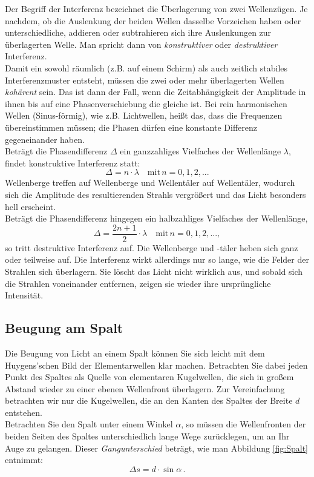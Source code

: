 Der Begriff der Interferenz bezeichnet die Überlagerung von zwei Wellenzügen. Je nachdem, ob die Auslenkung der beiden Wellen dasselbe Vorzeichen haben oder unterschiedliche, addieren oder subtrahieren sich ihre Auslenkungen zur überlagerten Welle. Man spricht dann von \textit{konstruktiver} oder \textit{destruktiver} Interferenz.\\
Damit ein sowohl räumlich (z.B. auf einem Schirm) als auch zeitlich stabiles Interferenzmuster entsteht, müssen die zwei oder mehr überlagerten Wellen \textit{kohärent} sein. Das ist dann der Fall, wenn die Zeitabhängigkeit der Amplitude in ihnen bis auf eine Phasenverschiebung die gleiche ist. Bei rein harmonischen Wellen (Sinus-förmig), wie z.B. Lichtwellen, heißt das, dass die Frequenzen übereinstimmen müssen; die Phasen dürfen eine konstante Differenz gegeneinander haben.\\
Beträgt die Phasendifferenz $\Delta$ ein ganzzahliges Vielfaches der Wellenlänge $\lambda$, findet konstruktive Interferenz statt:
\begin{equation}
	\Delta = n\cdot \lambda \quad\mathrm{mit}\, n= 0, 1, 2, ...
\end{equation}
Wellenberge treffen auf Wellenberge und Wellentäler auf Wellentäler, wodurch sich die Amplitude des resultierenden Strahls vergrößert und das Licht besonders hell erscheint.\\
Beträgt die Phasendifferenz hingegen ein halbzahliges Vielfaches der Wellenlänge,
\begin{equation}
	\Delta = \frac{2n+1}{2}\cdot \lambda \quad\mathrm{mit}\, n= 0, 1, 2, ...,
\end{equation}
so tritt destruktive Interferenz auf. Die Wellenberge und -täler heben sich ganz oder teilweise auf. Die Interferenz wirkt allerdings nur so lange, wie die Felder der Strahlen sich überlagern. Sie löscht das Licht nicht wirklich aus, und sobald sich die Strahlen voneinander entfernen, zeigen sie wieder ihre ursprüngliche Intensität.

\subsection{Beugung am Spalt}

Die Beugung von Licht an einem Spalt können Sie sich leicht mit dem Huygens'schen Bild der Elementarwellen klar machen. Betrachten Sie dabei jeden Punkt des Spaltes als Quelle von elementaren Kugelwellen, die sich in großem Abstand wieder zu einer ebenen Wellenfront überlagern. Zur Vereinfachung betrachten wir nur die Kugelwellen, die an den Kanten des Spaltes der Breite $d$ entstehen.\\
Betrachten Sie den Spalt unter einem Winkel $\alpha$, so müssen die Wellenfronten der beiden Seiten des Spaltes unterschiedlich lange Wege zurücklegen, um an Ihr Auge zu gelangen. Dieser \textit{Gangunterschied} beträgt, wie man Abbildung \ref{fig:Spalt} entnimmt:
\begin{equation}
 \Delta s = d\cdot\sin\alpha\, .
\end{equation}

